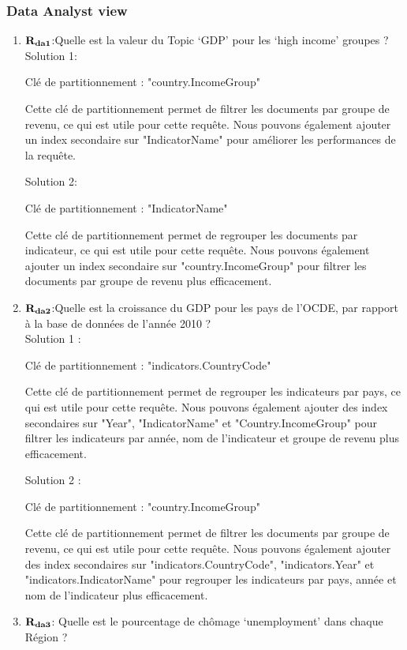 \subsubsection{Data Analyst view}
\begin{enumerate}
    \item ${\bf R_{da1}}$:Quelle est la valeur du Topic ‘GDP’ pour les ‘high income’ groupes ?\\

Solution 1:

Clé de partitionnement : "country.IncomeGroup"

Cette clé de partitionnement permet de filtrer les documents par groupe de revenu, ce qui est utile pour cette requête. Nous pouvons également ajouter un index secondaire sur "IndicatorName" pour améliorer les performances de la requête.

Solution 2:

Clé de partitionnement : "IndicatorName"

Cette clé de partitionnement permet de regrouper les documents par indicateur, ce qui est utile pour cette requête. Nous pouvons également ajouter un index secondaire sur "country.IncomeGroup" pour filtrer les documents par groupe de revenu plus efficacement.

    \item ${\bf R_{da2}}$:Quelle est la croissance du GDP pour les pays de l’OCDE, par rapport à la base de données
    de l’année 2010 ?\\

Solution 1 :

Clé de partitionnement : "indicators.CountryCode"

Cette clé de partitionnement permet de regrouper les indicateurs par pays, ce qui est utile pour cette requête. Nous pouvons également ajouter des index secondaires sur "Year", "IndicatorName" et "Country.IncomeGroup" pour filtrer les indicateurs par année, nom de l'indicateur et groupe de revenu plus efficacement.

Solution 2 :

Clé de partitionnement : "country.IncomeGroup"

Cette clé de partitionnement permet de filtrer les documents par groupe de revenu, ce qui est utile pour cette requête. Nous pouvons également ajouter des index secondaires sur "indicators.CountryCode", "indicators.Year" et "indicators.IndicatorName" pour regrouper les indicateurs par pays, année et nom de l'indicateur plus efficacement.
    \item ${\bf R_{da3}}$: Quelle est le pourcentage de chômage ‘unemployment’ dans chaque Région ?\\
    

\end{enumerate}
